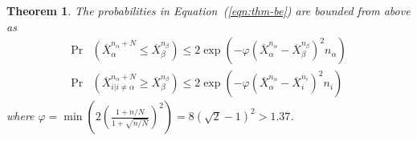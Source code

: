 \documentclass[]{article}
\newtheorem{thm}{Theorem}
\renewcommand{\eqref}[1]{Equation~(\ref{#1})}
\begin{document}
\begin{thm} The probabilities in \eqref{eqn:thm-be} are bounded from above as
\begin{align}
  \label{eqn:probound-blnk-hoeffding}
  \Pr&(\overline X_\alpha^{{n_\alpha}+N} \le \overline X_\beta^{n_\beta})
  \le 2\exp\left(- \varphi (\overline X_\alpha^{n_\alpha} - \overline X_\beta^{n_\beta})^2 n_\alpha
  \right)\nonumber\\
  \Pr&(\overline X_{i|i\ne\alpha}^{n_\alpha+N} \ge \overline X_\beta^{n_\beta})
  \le 2\exp\left(- \varphi (\overline X_\alpha^{n_\alpha} -\overline  X_i^{n_i})^2 n_i \right)
\end{align}
where $\varphi=\min \left(2(\frac {1+n/N} {1+\sqrt {n/N}})^2\right)=8(\sqrt 2 - 1)^2 > 1.37$.
\label{thm:hoeffding-prob-bounds}
\end{thm}
\end{document}
